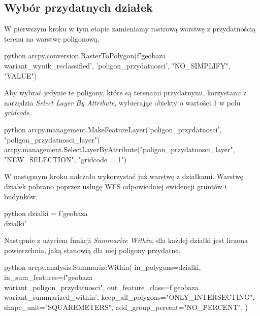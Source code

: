 \documentclass{article}
\begin{document}
\newpage

\subsection{Wybór przydatnych działek}
W pierwszym kroku w tym etapie zamieniamy rastrową warstwę z przydatnością terenu na warstwę poligonową.
\vspace{5pt}

\begin{mintedbox}{python}
arcpy.conversion.RasterToPolygon(f'{geobaza}\\{wariant}_wynik_reclassified', 'poligon_przydatnosci', "NO_SIMPLIFY", "VALUE")
\end{mintedbox}
\vspace{10pt}

Aby wybrać jedynie te poligony, które są terenami przydatnymi, korzystami z narzędzia \textit{Select Layer By Attribute}, wybierając obiekty o wartości 1 w polu \textit{gridcode}.
\vspace{5pt}

\begin{mintedbox}{python}
arcpy.management.MakeFeatureLayer('poligon_przydatnosci', "poligon_przydatnosci_layer")
arcpy.management.SelectLayerByAttribute("poligon_przydatnosci_layer", "NEW_SELECTION", "gridcode = 1")
\end{mintedbox}
\vspace{10pt}

W następnym kroku należało wykorzystać już warstwę z działkami. Warstwę działek pobrano poprzez usługę WFS odpowiedniej ewidencji gruntów i budynków.
\vspace{5pt}

\begin{mintedbox}{python}
dzialki = f'{geobaza}\\dzialki'
\end{mintedbox}
\vspace{10pt}

Następnie z użyciem funkcji \textit{Summarize Within}, dla każdej działki jest liczona powierzchnia, jaką stanowią dla niej poligony przydatne. 

\vspace{5pt}

\begin{mintedbox}{python}
arcpy.analysis.SummarizeWithin(
    in_polygons=dzialki,
    in_sum_features=f"{geobaza}\\{wariant}_poligon_przydatnosci",
    out_feature_class=f'{geobaza}\\{wariant}_summarized_within',
    keep_all_polygons="ONLY_INTERSECTING",
    shape_unit="SQUAREMETERS",
    add_group_percent="NO_PERCENT",
)    
\end{mintedbox}
\vspace{10pt}
\end{document}

